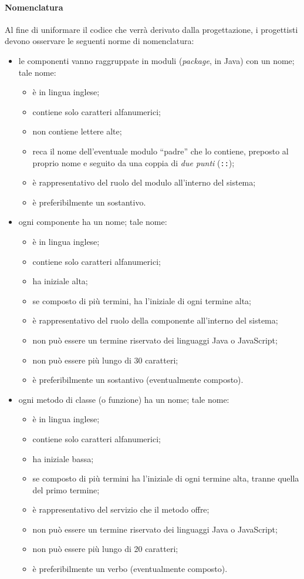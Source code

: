 \paragraph{Nomenclatura} Al fine di uniformare il codice che verrà derivato dalla progettazione, i progettisti devono osservare le seguenti norme di nomenclatura:
\begin{itemize}
	\item le componenti vanno raggruppate in moduli (\emph{package}, in Java) con un nome; tale nome:
	\begin{itemize}
		\item è in lingua inglese;
		\item contiene solo caratteri alfanumerici;
		\item non contiene lettere alte;
		\item reca il nome dell'eventuale modulo “padre” che lo contiene, preposto al proprio nome e seguito da una coppia di \emph{due punti} (\texttt{::});
		\item è rappresentativo del ruolo del modulo all'interno del sistema;
		\item è preferibilmente un sostantivo.
	\end{itemize}
	\item ogni componente ha un nome; tale nome:
	\begin{itemize}
		\item è in lingua inglese;
		\item contiene solo caratteri alfanumerici;
		\item ha iniziale alta;
		\item se composto di più termini, ha l'iniziale di ogni termine alta;
		\item è rappresentativo del ruolo della componente all'interno del sistema;
		\item non può essere un termine riservato dei linguaggi Java o JavaScript;
		\item non può essere più lungo di 30 caratteri;
		\item è preferibilmente un sostantivo (eventualmente composto).
	\end{itemize}
	\item ogni metodo di classe (o funzione) ha un nome; tale nome:
	\begin{itemize}
		\item è in lingua inglese;
		\item contiene solo caratteri alfanumerici;
		\item ha iniziale bassa;
		\item se composto di più termini ha l'iniziale di ogni termine alta, tranne quella del primo termine;
		\item è rappresentativo del servizio che il metodo offre;
		\item non può essere un termine riservato dei linguaggi Java o JavaScript;
		\item non può essere più lungo di 20 caratteri;
		\item è preferibilmente un verbo (eventualmente composto).
	\end{itemize}
\end{itemize}

